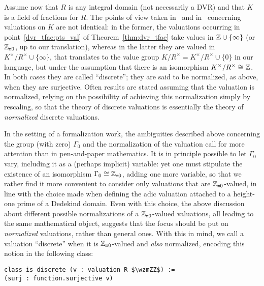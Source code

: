 \documentclass[sigplan,screen]{acmart}
\begin{document}
Assume now that $R$ is any integral domain (not necessarily a DVR) and that $K$ is a field of fractions for $R$. The points of view taken in~\cite[Chapitre~I]{Ser62} and in~\cite[Chapitre~VI, \S3, n$^\circ$6]{Bou85} concerning valuations on $K$ are not identical: in the former, the valuations occurring in point~\ref{dvr_tfae:pts_val} of Theorem~\ref{thm:dvr_tfae} take values in $\mathbb{Z}\cup\{\infty\}$ (or $\mathbb{Z}_{\mathtt{m}0}$, up to our translation), whereas in the latter they are valued in $K^\times/R^\times \cup\{\infty\}$, that translates to the value group $K/R^\times=K^\times/R^\times\cup\{0\}$ in our language, but under the assumption that there is an isomorphism $K^\times/R^\times\cong \mathbb{Z}$. In both cases they are called ``discrete''; they are said to be normalized, as above, when they are surjective. Often results are stated assuming that the valuation is normalized, relying on the possibility of achieving this normalization simply by rescaling, so that the theory of discrete valuations is essentially the theory of \emph{normalized} discrete valuations.

In the setting of a formalization work, the ambiguities described above concerning the group (with zero) $\Gamma_0$ and the normalization of the valuation call for more attention than in pen-and-paper mathematics. It is in principle possible to let $\Gamma_0$ vary, including it as a (perhaps implicit) variable: yet one must stipulate the existence of an isomorphism $\Gamma_0\cong\mathbb{Z}_{\mathtt{m}0}$, adding one more variable, so that we rather find it more convenient to consider only valuations that are $\mathbb{Z}_{\mathtt{m}0}$-valued, in line with the choice made when defining the adic valuation\href{https://leanprover-community.github.io/mathlib_docs/ring_theory/dedekind_domain/adic_valuation.html}{\extlink} attached to a height-one prime of a Dedekind domain. Even with this choice, the above discussion about different possible normalizations of a $\mathbb{Z}_{\mathtt{m}0}$-valued valuations, all leading to the same mathematical object, suggests that the focus should be put on \emph{normalized} valuations, rather than general ones. With this in mind, 
we call a valuation ``discrete'' when it is $\mathbb{Z}_{\mathtt{m}0}$-valued and \emph{also} normalized, encoding this notion in the following class\href{https://github.com/mariainesdff/local_fields_journal/blob/7ac213eb804fe7945468023527a0fe26ab23b3c8/src/discrete_valuation_ring/basic.lean#L129}{\extlink}:
\begin{lstlisting}[caption={Definition of discrete valuation.}, label={code:def_discrete}]
class is_discrete (v : valuation R $\wzmZZ$) := 
(surj : function.surjective v)
\end{lstlisting}
\end{document}
